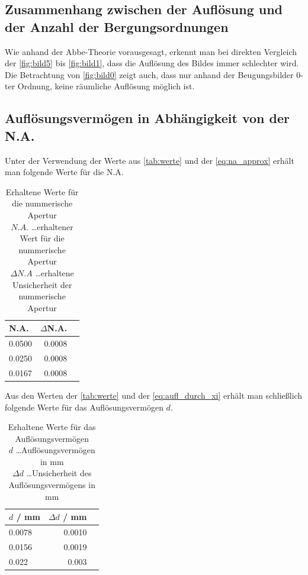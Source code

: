 \documentclass[11pt,ngerman]{scrartcl}
\begin{document}
\subsection{Zusammenhang zwischen der Auflösung und der Anzahl der Bergungsordnungen}

\noindent Wie anhand der Abbe-Theorie vorausgesagt, erkennt man bei direkten Vergleich der \autoref{fig:bild5} bis \autoref{fig:bild1}, dass die Auflösung des Bildes immer schlechter wird. Die Betrachtung von \autoref{fig:bild0} zeigt auch, dass nur anhand der Beugungsbilder 0-ter Ordnung, keine räumliche Auflösung möglich ist.

\newpage

\subsection{Auflösungsvermögen in Abhängigkeit von der N.A.}

Unter der Verwendung der Werte aus \autoref{tab:werte} und der \autoref{eq:na_approx} erhält man folgende Werte für die N.A.

\begin{table}[H]
	\caption{ Erhaltene Werte für die nummerische Apertur\\ $N.A.$ \dots erhaltener Wert für die nummerische Apertur  \\ $\Delta N.A$ \dots erhaltene Unsicherheit der nummerische Apertur}
	\label{tab:na}
	\begin{center}

		\begin{tabular}{lrr}
			\toprule
			N.A.   & $\Delta $N.A. \\
			\midrule
			0.0500 & 0.0008        \\
			0.0250 & 0.0008        \\
			0.0167 & 0.0008        \\
			\bottomrule
		\end{tabular}
	\end{center}
\end{table}

Aus den Werten der \autoref{tab:werte} und der \autoref{eq:aufl_durch_xi} erhält man schließlich folgende Werte für das Auflösungsvermögen $d$.

\begin{table}[H]
	\caption{ Erhaltene Werte für das Auflösungsvermögen\\ $d$ \dots Auflösungsvermögen in mm\\ $\Delta d$ \dots Unsicherheit des Auflösungsvermögens in mm}
	\label{tab:aufl}
	\begin{center}

		\begin{tabular}{lrr}
			\toprule
			$d $ / mm & $\Delta d $ / mm \\
			\midrule
			0.0078    & 0.0010           \\
			0.0156    & 0.0019           \\
			0.022     & 0.003            \\
			\bottomrule
		\end{tabular}
	\end{center}
\end{table}
\end{document}
